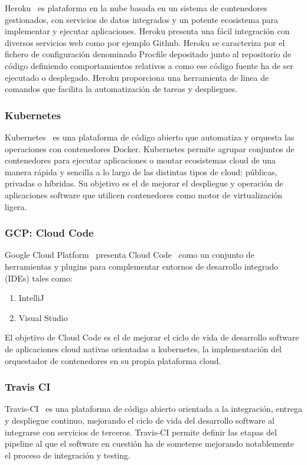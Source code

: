 \documentclass[a4paper,11pt]{book}
\begin{document}
Heroku~\cite{hero} es  plataforma en la nube basada en un sistema de contenedores gestionados, con servicios de datos integrados y un potente ecosistema para implementar y ejecutar aplicaciones. Heroku presenta una fácil integración con diversos servicios web como por ejemplo Github. Heroku se caracteriza por el fichero de configuración denominado Procfile depositado junto al repositorio de código definiendo comportamientos relativos a como ese código fuente ha de ser ejecutado o desplegado.  Heroku proporciona una herramienta de linea de comandos que facilita la automatización de tareas y despliegues.

\subsubsection{Kubernetes}
Kubernetes~\cite{kube} es una plataforma de código abierto que automatiza y orquesta las operaciones con contenedores Docker. Kubernetes permite agrupar conjuntos de contenedores para ejecutar aplicaciones o montar ecosistemas cloud de una manera rápida y sencilla a lo largo de las distintas tipos de cloud: públicas, privadas o híbridas. Su objetivo es el de mejorar el despliegue y operación de aplicaciones software que utilicen contenedores como motor de virtualización ligera.  

\subsubsection{GCP: Cloud Code}

Google Cloud Platform~\cite{gcp} presenta Cloud Code~\cite{gcpcode} como un conjunto de herramientas y plugins para complementar entornos de desarrollo integrado (IDEs)  tales como: 

\begin{enumerate}
\item IntelliJ 
\item Visual Studio
\end{enumerate}

El objetivo de Cloud Code es el de mejorar el ciclo de vida de desarrollo software de aplicaciones cloud  nativas orientadas a kubernetes,  la implementación del orquestador de contenedores en su propia plataforma cloud. 

\subsubsection{Travis CI}

Travis-CI~\cite{travis} es una plataforma de código abierto orientada a la integración, entrega y despliegue continuo, mejorando el ciclo de vida del desarrollo software al integrarse con servicios de terceros. Travis-CI permite definir las etapas del pipeline al que el software en cuestión ha de someterse mejorando notablemente el proceso de integración y testing. 
\end{document}
